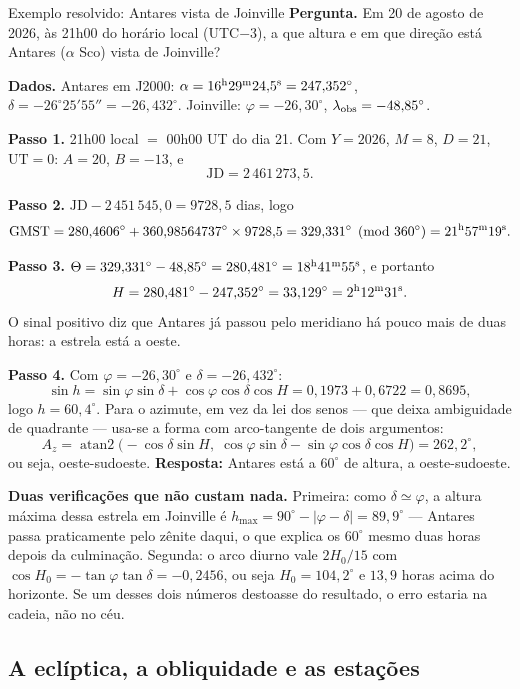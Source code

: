 \documentclass[11pt,a4paper]{article}
\begin{document}
\begin{lessonblock}{Exemplo resolvido: Antares vista de Joinville}
\textbf{Pergunta.} Em 20 de agosto de 2026, às 21h00 do horário local (UTC$-3$), a que
altura e em que direção está Antares ($\alpha$ Sco) vista de Joinville?

\textbf{Dados.} Antares em J2000: $\alpha=16^{\rm h}29^{\rm m}24{,}5^{\rm s}=247{,}352^\circ$,
$\delta=-26^\circ25'55''=-26{,}432^\circ$. Joinville: $\varphi=-26{,}30^\circ$,
$\lambda_{\rm obs}=-48{,}85^\circ$.

\textbf{Passo 1.} 21h00 local $=$ 00h00 UT do dia 21. Com $Y=2026$, $M=8$, $D=21$,
$\mathrm{UT}=0$: $A=20$, $B=-13$, e
\[
\mathrm{JD}=2\,461\,273{,}5.
\]

\textbf{Passo 2.} $\mathrm{JD}-2\,451\,545{,}0=9728{,}5$ dias, logo
\[
\mathrm{GMST}=280{,}4606^\circ+360{,}98564737^\circ\times9728{,}5
=329{,}331^\circ \pmod{360^\circ}=21^{\rm h}57^{\rm m}19^{\rm s}.
\]

\textbf{Passo 3.} $\Theta=329{,}331^\circ-48{,}85^\circ=280{,}481^\circ=18^{\rm h}41^{\rm m}55^{\rm s}$,
e portanto
\[
H=280{,}481^\circ-247{,}352^\circ=33{,}129^\circ=2^{\rm h}12^{\rm m}31^{\rm s}.
\]
O sinal positivo diz que Antares já passou pelo meridiano há pouco mais de duas horas: a
estrela está a oeste.

\textbf{Passo 4.} Com $\varphi=-26{,}30^\circ$ e $\delta=-26{,}432^\circ$:
\[
\sin h=\sin\varphi\sin\delta+\cos\varphi\cos\delta\cos H
=0{,}1973+0{,}6722=0{,}8695,
\]
logo $h=60{,}4^\circ$. Para o azimute, em vez da lei dos senos --- que deixa ambiguidade
de quadrante --- usa-se a forma com arco-tangente de dois argumentos:
\[
A_z=\operatorname{atan2}\big(-\cos\delta\sin H,\;
\cos\varphi\sin\delta-\sin\varphi\cos\delta\cos H\big)
=262{,}2^\circ,
\]
ou seja, oeste-sudoeste. \textbf{Resposta:} Antares está a $60^\circ$ de altura, a
oeste-sudoeste.

\textbf{Duas verificações que não custam nada.} Primeira: como
$\delta\simeq\varphi$, a altura máxima dessa estrela em Joinville é
$h_{\max}=90^\circ-|\varphi-\delta|=89{,}9^\circ$ --- Antares passa praticamente pelo
zênite daqui, o que explica os $60^\circ$ mesmo duas horas depois da culminação. Segunda:
o arco diurno vale $2H_0/15$ com $\cos H_0=-\tan\varphi\tan\delta=-0{,}2456$, ou seja
$H_0=104{,}2^\circ$ e $13{,}9$ horas acima do horizonte. Se um desses dois números
destoasse do resultado, o erro estaria na cadeia, não no céu.
\end{lessonblock}

\subsection*{A eclíptica, a obliquidade e as estações}
\end{document}
